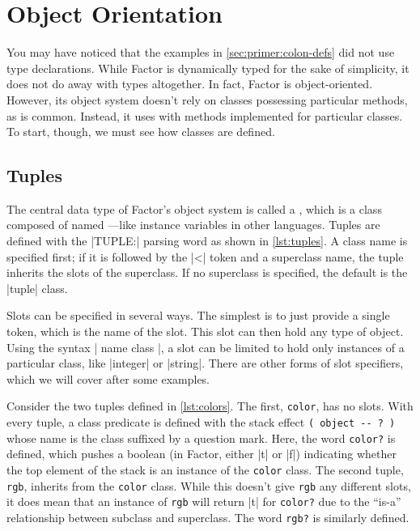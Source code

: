 \section{Object Orientation}\label{sec:primer:oo}

You may have noticed that the examples in \cref{sec:primer:colon-defs} did not
use type declarations.  While Factor is dynamically typed for the sake of
simplicity, it does not do away with types altogether.  In fact, Factor is
object-oriented.  However, its object system doesn't rely on classes possessing
particular methods, as is common.  Instead, it uses  with
methods implemented for particular classes.  To start, though, we must see how
classes are defined.

\subsection{Tuples}


The central data type of Factor's object system is called a , which
is a class composed of named ---like instance variables in other
languages.  Tuples are defined with the \factor|TUPLE:| parsing word as shown
in \vref{lst:tuples}.  A class name is specified first; if it is followed by
the \factor|<| token and a superclass name, the tuple inherits the slots of the
superclass.  If no superclass is specified, the default is the \factor|tuple|
class.

Slots can be specified in several ways.  The simplest is to just provide a
single token, which is the name of the slot.  This slot can then hold any type
of object.  Using the syntax
%
\factor|{ name class }|,
%
a slot can be limited to hold only instances of a particular class, like
\factor|integer| or \factor|string|.  There are other forms of slot specifiers,
which we will cover after some examples.


Consider the two tuples defined in \vref{lst:colors}.  The first,
\Verb|color|, has no slots.  With every tuple, a class predicate is defined
with the stack effect
%
\verb|( object -- ? )|
%
whose name is the class suffixed by a question mark.  Here, the word
\Verb|color?| is defined, which pushes a boolean (in Factor, either
\factor|t| or \factor|f|) indicating whether the top element of the stack is an
instance of the \Verb|color| class.  The second tuple, \Verb|rgb|, inherits
from the \Verb|color| class.  While this doesn't give \Verb|rgb| any
different slots, it does mean that an instance of \Verb|rgb| will return
\factor|t| for \Verb|color?| due to the ``is-a'' relationship between
subclass and superclass.  The word \Verb|rgb?| is similarly defined.

